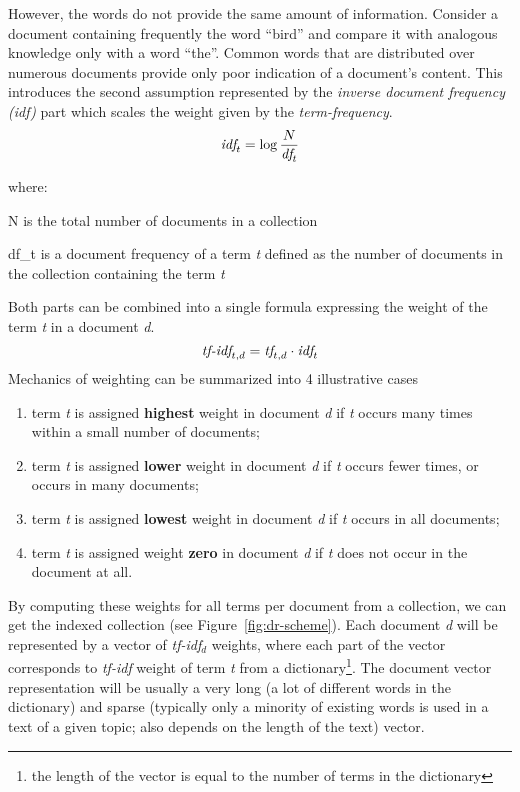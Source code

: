     However, the words do not provide the same amount of information. Consider a document containing frequently the word \enquote{bird} and compare it with analogous knowledge only with a word \enquote{the}. Common words that are distributed over numerous documents provide only poor indication of a document's content. This introduces the second assumption represented by the \emph{inverse document frequency (idf)} part which scales the weight given by the \emph{term-frequency}. 
    \begin{equation}
        \emph{idf}_t = \log \frac{N}{\emph{df}_t}
    \end{equation}

    where:
    \begin{where}
        \item [N] is the total number of documents in a collection
        \item [df_{t}] is a document frequency of a term \emph{t} defined as the number of documents in the collection containing the term \emph{t}
    \end{where}
    
    Both parts can be combined into a single formula expressing the weight of the term \emph{t} in a document \emph{d}.
    \begin{equation}
        \label{equ:tfidf}
        \emph{tf-idf}_{t,d} = \emph{tf}_{t,d} \cdot \emph{idf}_{t}
    \end{equation} Mechanics of weighting can be summarized into 4 illustrative cases
    \begin{enumerate}
        \item term \emph{t} is assigned \textbf{highest} weight in document \emph{d} if \emph{t} occurs many times within a small number of documents;
        \item term \emph{t} is assigned \textbf{lower} weight in document \emph{d} if \emph{t} occurs fewer times, or occurs in many documents;
        \item term \emph{t} is assigned \textbf{lowest} weight in document \emph{d} if \emph{t} occurs in all documents;
        \item term \emph{t} is assigned weight \textbf{zero} in document \emph{d} if \emph{t} does not occur in the document at all.
       ~\parencite{manning2008introduction}
    \end{enumerate}

    By computing these weights for all terms per document from a collection, we can get the indexed collection (see Figure~\ref{fig:dr-scheme}). Each document \emph{d} will be represented by a vector of \emph{tf-idf}$_{d}$ weights, where each part of the vector corresponds to \emph{tf-idf} weight of term \emph{t} from a dictionary\footnote{the length of the vector is equal to the number of terms in the dictionary}. The document vector representation will be usually a very long (a lot of different words in the dictionary) and sparse (typically only a minority of existing words is used in a text of a given topic; also depends on the length of the text) vector.

